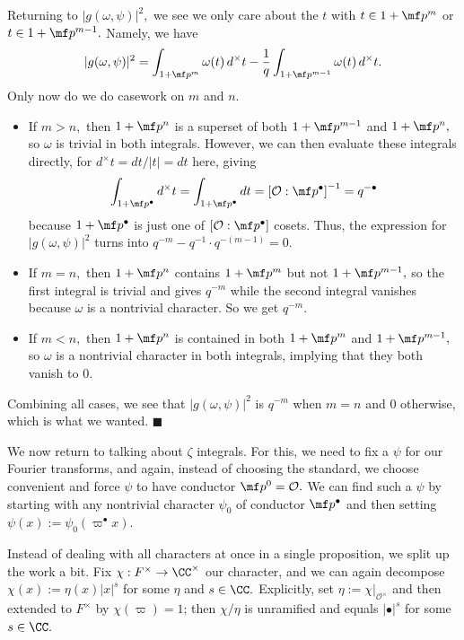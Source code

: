 Returning to $|g(\omega,\psi)|^2,$ we see we only care about the $t$ with $t\in1+\mf p^m$ or $t\in1+\mf p^{m-1}.$ Namely, we have
\[|g(\omega,\psi)|^2=\int_{1+\mf p^m}\omega(t)\,d^\times t-\frac1q\int_{1+\mf p^{m-1}}\omega(t)\,d^\times t.\]
Only now do we do casework on $m$ and $n.$
\begin{itemize}
    \item If $m>n,$ then $1+\mf p^n$ is a superset of both $1+\mf p^{m-1}$ and $1+\mf p^n,$ so $\omega$ is trivial in both integrals. However, we can then evaluate these integrals directly, for $d^\times t=dt/|t|=dt$ here, giving
    \[\int_{1+\mf p^\bullet}d^\times t=\int_{1+\mf p^\bullet}dt=\left[\mathcal O:\mf p^\bullet\right]^{-1}=q^{-\bullet}\]
    because $1+\mf p^\bullet$ is just one of $\left[\mathcal O:\mf p^\bullet\right]$ cosets. Thus, the expression for $|g(\omega,\psi)|^2$ turns into $q^{-m}-q^{-1}\cdot q^{-(m-1)}=0.$
    \item If $m=n,$ then $1+\mf p^n$ contains $1+\mf p^m$ but not $1+\mf p^{m-1},$ so the first integral is trivial and gives $q^{-m}$ while the second integral vanishes because $\omega$ is a nontrivial character. So we get $q^{-m}.$
    \item If $m<n,$ then $1+\mf p^n$ is contained in both $1+\mf p^m$ and $1+\mf p^{m-1},$ so $\omega$ is a nontrivial character in both integrals, implying that they both vanish to $0.$
\end{itemize}
Combining all cases, we see that $|g(\omega,\psi)|^2$ is $q^{-m}$ when $m=n$ and $0$ otherwise, which is what we wanted. $\blacksquare$

We now return to talking about $\zeta$ integrals. For this, we need to fix a $\psi$ for our Fourier transforms, and again, instead of choosing the standard, we choose convenient and force $\psi$ to have conductor $\mf p^0=\mathcal O.$ We can find such a $\psi$ by starting with any nontrivial character $\psi_0$ of conductor $\mf p^\bullet$ and then setting $\psi(x):=\psi_0\left(\varpi^\bullet x\right).$

Instead of dealing with all characters at once in a single proposition, we split up the work a bit. Fix $\chi:F^\times\to\CC^\times$ our character, and we can again decompose $\chi(x):=\eta(x)|x|^s$ for some $\eta$ and $s\in\CC.$ Explicitly, set $\eta:=\chi|_{\mathcal O^\times}$ and then extended to $F^\times$ by $\chi(\varpi)=1$; then $\chi/\eta$ is unramified and equals $|\bullet|^s$ for some $s\in\CC.$


